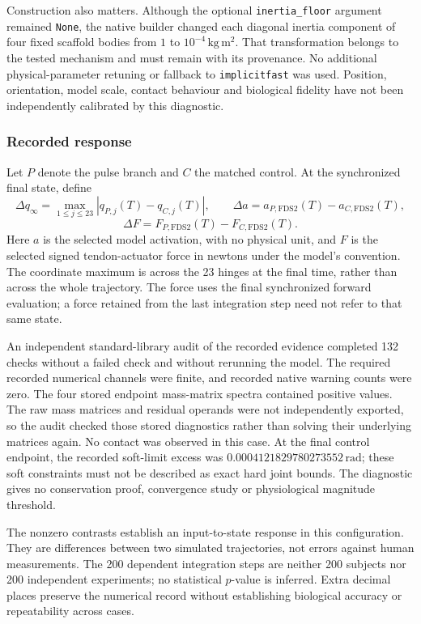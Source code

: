 Construction also matters. Although the optional \texttt{inertia\_floor} argument remained \texttt{None}, the native builder changed each diagonal inertia component of four fixed scaffold bodies from $1$ to $10^{-4}\,\mathrm{kg\,m^2}$. That transformation belongs to the tested mechanism and must remain with its provenance. No additional physical-parameter retuning or fallback to \texttt{implicitfast} was used. Position, orientation, model scale, contact behaviour and biological fidelity have not been independently calibrated by this diagnostic.

\subsubsection{Recorded response}

Let $P$ denote the pulse branch and $C$ the matched control. At the synchronized final state, define
\[
\Delta q_{\infty}=\max_{1\leq j\leq23}|q_{P,j}(T)-q_{C,j}(T)|,
\qquad
\Delta a=a_{P,\mathrm{FDS2}}(T)-a_{C,\mathrm{FDS2}}(T),
\]
\[
\Delta F=F_{P,\mathrm{FDS2}}(T)-F_{C,\mathrm{FDS2}}(T).
\]
Here $a$ is the selected model activation, with no physical unit, and $F$ is the selected signed tendon-actuator force in newtons under the model's convention. The coordinate maximum is across the 23 hinges at the final time, rather than across the whole trajectory. The force uses the final synchronized forward evaluation; a force retained from the last integration step need not refer to that same state.



An independent standard-library audit of the recorded evidence completed 132 checks without a failed check and without rerunning the model. The required recorded numerical channels were finite, and recorded native warning counts were zero. The four stored endpoint mass-matrix spectra contained positive values. The raw mass matrices and residual operands were not independently exported, so the audit checked those stored diagnostics rather than solving their underlying matrices again. No contact was observed in this case. At the final control endpoint, the recorded soft-limit excess was $0.0004121829780273552\,\mathrm{rad}$; these soft constraints must not be described as exact hard joint bounds. The diagnostic gives no conservation proof, convergence study or physiological magnitude threshold.

The nonzero contrasts establish an input-to-state response in this configuration. They are differences between two simulated trajectories, not errors against human measurements. The 200 dependent integration steps are neither 200 subjects nor 200 independent experiments; no statistical $p$-value is inferred. Extra decimal places preserve the numerical record without establishing biological accuracy or repeatability across cases.

